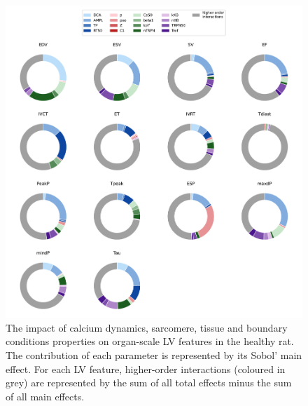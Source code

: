 \begin{figure}[ht!]
    \myfloatalign
    \includegraphics[width=\textwidth]{figures/chapter07/gsa_16p_donut_S1.pdf}
    \caption{The impact of calcium dynamics, sarcomere, tissue and boundary conditions properties on organ-scale LV features in the healthy rat. The contribution of each parameter is represented by its Sobol' main effect. For each LV feature, higher-order interactions (coloured in grey) are represented by the sum of all total effects minus the sum of all main effects.}
    \label{fig:s1stdonutfinal}
\end{figure}

